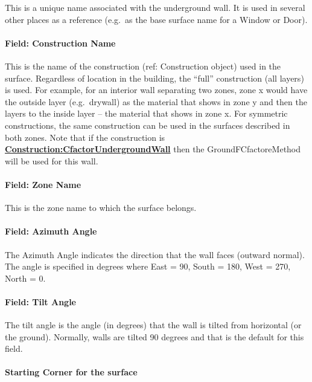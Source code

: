 This is a unique name associated with the underground wall. It is used in several other places as a reference (e.g.~as the base surface name for a Window or Door).

\paragraph{Field: Construction Name}\label{field-construction-name-2-001}

This is the name of the construction (ref: Construction object) used in the surface. Regardless of location in the building, the ``full'' construction (all layers) is used. For example, for an interior wall separating two zones, zone x would have the outside layer (e.g.~drywall) as the material that shows in zone y and then the layers to the inside layer -- the material that shows in zone x. For symmetric constructions, the same construction can be used in the surfaces described in both zones. Note that if the construction is \textbf{\hyperref[constructioncfactorundergroundwall]{Construction:CfactorUndergroundWall}} then the GroundFCfactoreMethod will be used for this wall.

\paragraph{Field: Zone Name}\label{field-zone-name-2-007}

This is the zone name to which the surface belongs.

\paragraph{Field: Azimuth Angle}\label{field-azimuth-angle-2}

The Azimuth Angle indicates the direction that the wall faces (outward normal). The angle is specified in degrees where East = 90, South = 180, West = 270, North = 0.

\paragraph{Field: Tilt Angle}\label{field-tilt-angle-2}

The tilt angle is the angle (in degrees) that the wall is tilted from horizontal (or the ground). Normally, walls are tilted 90 degrees and that is the default for this field.

\paragraph{Starting Corner for the surface}\label{starting-corner-for-the-surface-2}

